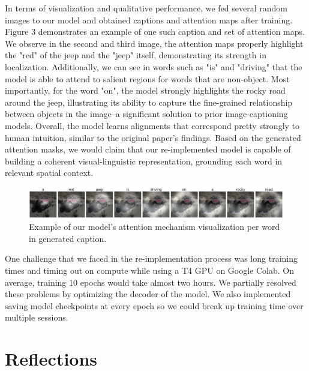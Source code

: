 \documentclass{article}
\begin{document}
In terms of visualization and qualitative performance, we fed several random images to our model and obtained captions and attention maps after training. Figure 3 demonstrates an example of one such caption and set of attention maps. We observe in the second and third image, the attention maps properly highlight the "red" of the jeep and the "jeep" itself, demonstrating its strength in localization. Additionally, we can see in words such as "is" and "driving" that the model is able to attend to salient regions for words that are non-object. Most importantly, for the word "on", the model strongly highlights the rocky road around the jeep, illustrating its ability to capture the fine-grained relationship between objects in the image--a significant solution to prior image-captioning models. Overall, the model learns alignments that correspond pretty strongly to human intuition, similar to the original paper's findings. Based on the generated attention masks, we would claim that our re-implemented model is capable of building a coherent visual-linguistic representation, grounding each word in relevant spatial context. 

\begin{figure}[h]
    \centering
    \includegraphics[width=0.75\linewidth]{example-jeep.png}
    \caption{Example of our model's attention mechanism visualization per word in generated caption.}
    \label{fig:enter-label}
\end{figure}

One challenge that we faced in the re-implementation process was long training times and timing out on compute while using a T4 GPU on Google Colab. On average, training 10 epochs would take almost two hours. We partially resolved these problems by optimizing the decoder of the model. We also implemented saving model checkpoints at every epoch so we could break up training time over multiple sessions.

\section{Reflections}

\end{document}
